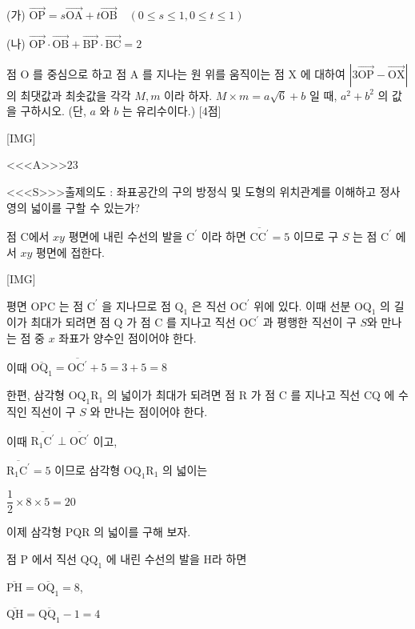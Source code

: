 \documentclass{oblivoir}
\begin{document}
(가) $\overrightarrow{\mathrm{OP}}=s \overrightarrow{\mathrm{OA}}+t \overrightarrow{\mathrm{OB}} \quad(0 \leq s \leq 1,0 \leq t \leq 1)$

(나) $\overrightarrow{\mathrm{OP}} \cdot \overrightarrow{\mathrm{OB}}+\overrightarrow{\mathrm{BP}} \cdot \overrightarrow{\mathrm{BC}}=2$

점 $\mathrm{O}$ 를 중심으로 하고 점 $\mathrm{A}$ 를 지나는 원 위를 움직이는 점 $\mathrm{X}$ 에 대하여 $|3 \overrightarrow{\mathrm{OP}}-\overrightarrow{\mathrm{OX}}|$ 의 최댓값과 최솟값을 각각 $M, m$ 이라 하자. $M \times m=a \sqrt{6}+b$ 일 때, $a^{2}+b^{2}$ 의 값을 구하시오. (단, $a$ 와 $b$ 는 유리수이다.) [4점]

[IMG]

<<<A>>>$23$

<<<S>>>출제의도 : 좌표공간의 구의 방정식 및 도형의 위치관계를 이해하고 정사영의 넓이를 구할 수 있는가?

점 C에서 $x y$ 평면에 내린 수선의 발을 $\mathrm{C}^{\prime}$ 이라 하면 $\overline{\mathrm{CC}^{\prime}}=5$ 이므로 구 $S$ 는 점 $\mathrm{C}^{\prime}$ 에서 $x y$ 평면에 접한다.

[IMG]

평면 $\mathrm{OPC}$ 는 점 $\mathrm{C}^{\prime}$ 을 지나므로 점 $\mathrm{Q}_{1}$ 은 직선 $\mathrm{OC}^{\prime}$ 위에 있다. 이때 선분 $\mathrm{OQ}_{1}$ 의 길이가 최대가 되려면 점 $\mathrm{Q}$ 가 점 $\mathrm{C}$ 를 지나고 직선 $\mathrm{OC}^{\prime}$ 과 평행한 직선이 구 $S$와 만나는 점 중 $x$ 좌표가 양수인 점이어야 한다.

이때
$\overline{\mathrm{OQ}_{1}}=\overline{\mathrm{OC}^{\prime}}+5=3+5=8$

한편, 삼각형 $\mathrm{OQ}_{1} \mathrm{R}_{1}$ 의 넓이가 최대가 되려면 점 $\mathrm{R}$ 가 점 $\mathrm{C}$ 를 지나고 직선 $\mathrm{CQ}$ 에 수직인 직선이 구 $S$ 와 만나는 점이어야 한다.

이때 $\overline{\mathrm{R}_{1} \mathrm{C}^{\prime}} \perp \overline{\mathrm{OC}^{\prime}}$ 이고, 

$\overline{\mathrm{R}_{1} \mathrm{C}^{\prime}}=5$ 이므로 삼각형 $\mathrm{OQ}_{1} \mathrm{R}_{1}$ 의 넓이는

$\dfrac{1}{2} \times 8 \times 5=20$

이제 삼각형 $\mathrm{PQR}$ 의 넓이를 구해 보자.

점 $\mathrm{P}$ 에서 직선 $\mathrm{QQ}_{1}$ 에 내린 수선의 발을 $\mathrm{H}$라 하면

$\overline{\mathrm{PH}}=\overline{\mathrm{OQ}_{1}}=8$,

$\overline{\mathrm{QH}}=\overline{\mathrm{QQ}_{1}}-1=4$
\end{document}
